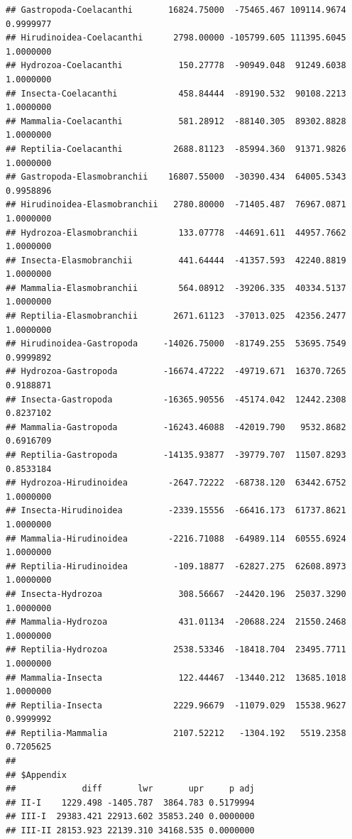 \documentclass[
  12pt,
]{article}
\begin{document}
\begin{verbatim}
## Gastropoda-Coelacanthi       16824.75000  -75465.467 109114.9674 0.9999977
## Hirudinoidea-Coelacanthi      2798.00000 -105799.605 111395.6045 1.0000000
## Hydrozoa-Coelacanthi           150.27778  -90949.048  91249.6038 1.0000000
## Insecta-Coelacanthi            458.84444  -89190.532  90108.2213 1.0000000
## Mammalia-Coelacanthi           581.28912  -88140.305  89302.8828 1.0000000
## Reptilia-Coelacanthi          2688.81123  -85994.360  91371.9826 1.0000000
## Gastropoda-Elasmobranchii    16807.55000  -30390.434  64005.5343 0.9958896
## Hirudinoidea-Elasmobranchii   2780.80000  -71405.487  76967.0871 1.0000000
## Hydrozoa-Elasmobranchii        133.07778  -44691.611  44957.7662 1.0000000
## Insecta-Elasmobranchii         441.64444  -41357.593  42240.8819 1.0000000
## Mammalia-Elasmobranchii        564.08912  -39206.335  40334.5137 1.0000000
## Reptilia-Elasmobranchii       2671.61123  -37013.025  42356.2477 1.0000000
## Hirudinoidea-Gastropoda     -14026.75000  -81749.255  53695.7549 0.9999892
## Hydrozoa-Gastropoda         -16674.47222  -49719.671  16370.7265 0.9188871
## Insecta-Gastropoda          -16365.90556  -45174.042  12442.2308 0.8237102
## Mammalia-Gastropoda         -16243.46088  -42019.790   9532.8682 0.6916709
## Reptilia-Gastropoda         -14135.93877  -39779.707  11507.8293 0.8533184
## Hydrozoa-Hirudinoidea        -2647.72222  -68738.120  63442.6752 1.0000000
## Insecta-Hirudinoidea         -2339.15556  -66416.173  61737.8621 1.0000000
## Mammalia-Hirudinoidea        -2216.71088  -64989.114  60555.6924 1.0000000
## Reptilia-Hirudinoidea         -109.18877  -62827.275  62608.8973 1.0000000
## Insecta-Hydrozoa               308.56667  -24420.196  25037.3290 1.0000000
## Mammalia-Hydrozoa              431.01134  -20688.224  21550.2468 1.0000000
## Reptilia-Hydrozoa             2538.53346  -18418.704  23495.7711 1.0000000
## Mammalia-Insecta               122.44467  -13440.212  13685.1018 1.0000000
## Reptilia-Insecta              2229.96679  -11079.029  15538.9627 0.9999992
## Reptilia-Mammalia             2107.52212   -1304.192   5519.2358 0.7205625
## 
## $Appendix
##             diff       lwr       upr     p adj
## II-I    1229.498 -1405.787  3864.783 0.5179994
## III-I  29383.421 22913.602 35853.240 0.0000000
## III-II 28153.923 22139.310 34168.535 0.0000000
\end{verbatim}
\end{document}
